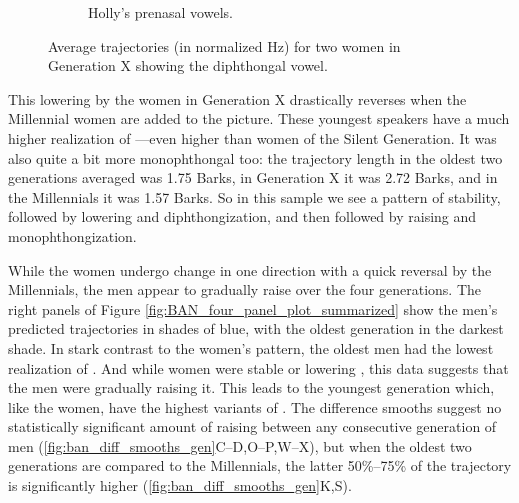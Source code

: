 \begin{figure}[tb!]
\begin{subfigure}[t]{2.925in}
        \caption{Holly's prenasal vowels.}
        \label{fig:holly_prenasal}
    \end{subfigure}
    \hspace{\fill}
    \caption{Average trajectories (in normalized Hz) for two women in Generation X showing the diphthongal \ban vowel.}
    \label{fig:kim_and_holly}
\end{figure}

This lowering by the women in Generation X drastically reverses when the Millennial women are added to the picture. These youngest speakers have a much higher realization of \ban---even higher than women of the Silent Generation. It was also quite a bit more monophthongal too: the trajectory length in the oldest two generations averaged was 1.75 Barks, in Generation X it was 2.72 Barks, and in the Millennials it was 1.57 Barks. So in this sample we see a pattern of stability, followed by lowering and diphthongization, and then followed by raising and monophthongization.

While the women undergo change in one direction with a quick reversal by the Millennials, the men appear to gradually raise \ban over the four generations. The right panels of Figure \ref{fig:BAN_four_panel_plot_summarized} show the men's predicted trajectories in shades of blue, with the oldest generation in the darkest shade. In stark contrast to the women's pattern, the oldest men had the lowest realization of \ban. And while women were stable or lowering \ban, this data suggests that the men were gradually raising it. This leads to the youngest generation which, like the women, have the highest variants of \ban. The difference smooths suggest no statistically significant amount of raising between any consecutive generation of men (\ref{fig:ban_diff_smooths_gen}C--D,O--P,W--X), but when the oldest two generations are compared to the Millennials, the latter 50\%--75\% of the trajectory is significantly higher (\ref{fig:ban_diff_smooths_gen}K,S).

